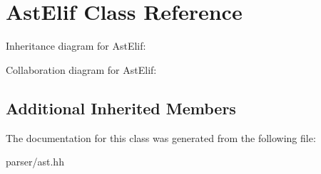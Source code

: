 \hypertarget{classAstElif}{}\section{Ast\+Elif Class Reference}
\label{classAstElif}


Inheritance diagram for Ast\+Elif\+:


Collaboration diagram for Ast\+Elif\+:
\subsection*{Additional Inherited Members}


The documentation for this class was generated from the following file\+:\begin{DoxyCompactItemize}
\item 
parser/ast.\+hh\end{DoxyCompactItemize}
